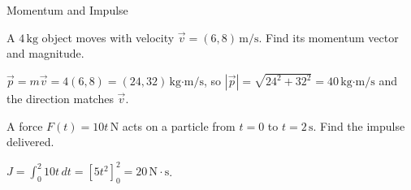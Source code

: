 \begin{KnowledgePoint}{Momentum and Impulse \Core}
  \KPProblems
\begin{cheatproblem}
  A $4\,\text{kg}$ object moves with velocity $\vec v=(6,8)\,\text{m/s}$. Find its momentum vector and magnitude.
\begin{solutionbox}
  $\vec p=m\vec v=4(6,8)=(24,32)\,\text{kg·m/s}$, so $|\vec p|=\sqrt{24^2+32^2}=40\,\text{kg·m/s}$ and the direction matches $\vec v$.
\end{solutionbox}
\end{cheatproblem}
\begin{cheatproblem}
  A force $F(t)=10t\,\text{N}$ acts on a particle from $t=0$ to $t=2\,\text{s}$. Find the impulse delivered.
\begin{solutionbox}
  $J=\int_0^2 10t\,dt=\left[5t^2\right]_0^2=20\,\text{N}\cdot\text{s}$.
\end{solutionbox}
\end{cheatproblem}
\end{KnowledgePoint}

